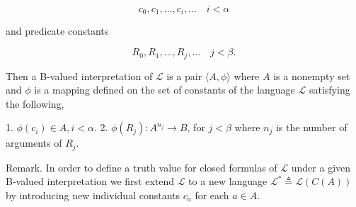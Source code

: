 $$c_0, c_1, \ldots, c_i, \ldots \quad i < \alpha$$

and predicate constants

$$R_0, R_1, \ldots, R_j, \ldots \quad j < \beta.$$

Then a B-valued interpretation of $\mathcal{L}$ is a pair $\langle A, \phi \rangle$ where $A$ is a nonempty set and $\phi$ is a mapping defined on the set of constants of the language $\mathcal{L}$ satisfying the following,

1. $\phi(c_i) \in A, i < \alpha.$
2. $\phi(R_j) \colon A^{n_j} \rightarrow B$, for $j < \beta$ where $n_j$ is the number of arguments of $R_j$.

Remark. In order to define a truth value for closed formulas of $\mathcal{L}$ under a given B-valued interpretation we first extend $\mathcal{L}$ to a new language $\mathcal{L}^* \triangleq \mathcal{L}(C(A))$ by introducing new individual constants $c_a$ for each $a \in A$.
